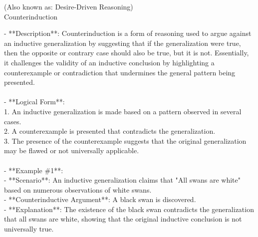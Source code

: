 \documentclass[a4paper,12pt,single,pdftex]{scrartcl}
\begin{document}
  
    
      (Also known as: Desire-Driven Reasoning)
    \\

  

Counterinduction
    
      - **Description**: Counterinduction is a form of reasoning used to argue against an inductive generalization by suggesting that if the generalization were true, then the opposite or contrary case should also be true, but it is not. Essentially, it challenges the validity of an inductive conclusion by highlighting a counterexample or contradiction that undermines the general pattern being presented.
    \\

    
      
    \\

    
      - **Logical Form**:
    \\

    
        1. An inductive generalization is made based on a pattern observed in several cases.
    \\

    
        2. A counterexample is presented that contradicts the generalization.
    \\

    
        3. The presence of the counterexample suggests that the original generalization may be flawed or not universally applicable.
    \\

    
      
    \\

    
      - **Example \#1**:
    \\

    
        - **Scenario**: An inductive generalization claims that "All swans are white" based on numerous observations of white swans.
    \\

    
        - **Counterinductive Argument**: A black swan is discovered.
    \\

    
        - **Explanation**: The existence of the black swan contradicts the generalization that all swans are white, showing that the original inductive conclusion is not universally true.
    \\

    
      
\end{document}
